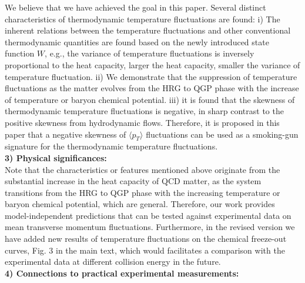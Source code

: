 \documentclass[aps,article,author-year,notitlepage,showpacs]{revtex4-2}
\begin{document}
\begin{itemize}
We believe that we have achieved the goal in this paper. Several distinct characteristics of thermodynamic temperature fluctuations are found: i) The inherent relations between the temperature fluctuations and other conventional thermodynamic quantities are found based on the newly introduced state function $W$, e.g., the variance of temperature fluctuations is inversely proportional to the heat capacity, larger the heat capacity, smaller the variance of temperature fluctuation. ii) We demonstrate that the suppression of temperature fluctuations as the matter evolves from the HRG to QGP phase with the increase of temperature or baryon chemical potential. iii) it is found that the skewness of thermodynamic temperature fluctuations is negative, in sharp contrast to the positive skewness from hydrodynamic flows. Therefore, it is proposed in this paper that a negative skewness of $\langle p_{T} \rangle$ fluctuations can be used as a smoking-gun signature for the thermodynamic temperature fluctuations.\\[-1ex]

{\bf 3) Physical significances:}\\[-2ex]

Note that the characteristics or features mentioned above originate from the substantial increase in the heat capacity of QCD matter, as the system transitions from the HRG to QGP phase with the increasing temperature or baryon chemical potential, which are general. Therefore, our work provides model-independent predictions that can be tested against experimental data on mean transverse momentum fluctuations. Furthermore, in the revised version we have added new results of temperature fluctuations on the chemical freeze-out curves, Fig. 3 in the main text, which would facilitates a comparison with the experimental data at different collision energy in the future.\\[-1ex]

{\bf 4) Connections to practical experimental measurements:}\\[-2ex]


\end{itemize}
\end{document}
